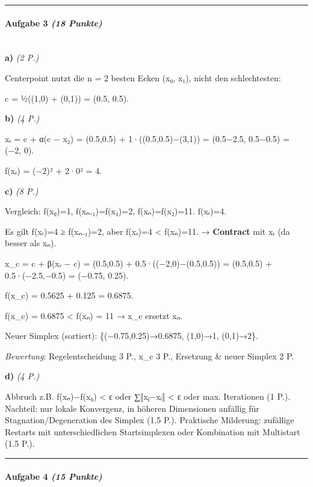 \documentclass[11pt, a4paper]{article}
\begin{document}
\noindent\textcolor{rulegray}{\rule{\linewidth}{0.4pt}}


\paragraph{Aufgabe 3 \textit{(18 Punkte)}}\mbox{}\\[2pt]

\textbf{a)} \textit{(2 P.)}

Centerpoint nutzt die n = 2 besten Ecken (x⃗₀, x⃗₁), nicht den schlechtesten:

c⃗ = ½((1,0) + (0,1)) = (0.5, 0.5).


\textbf{b)} \textit{(4 P.)}

x⃗ᵣ = c⃗ + α(c⃗ − x⃗₂) = (0.5,0.5) + 1·((0.5,0.5)−(3,1)) = (0.5−2.5, 0.5−0.5) = (−2, 0).

f(x⃗ᵣ) = (−2)² + 2·0² = 4.


\textbf{c)} \textit{(8 P.)}

Vergleich: f(x⃗₀)=1, f(x⃗ₙ₋₁)=f(x⃗₁)=2, f(x⃗ₙ)=f(x⃗₂)=11. f(x⃗ᵣ)=4.

Es gilt f(x⃗ᵣ)=4 ≥ f(x⃗ₙ₋₁)=2, aber f(x⃗ᵣ)=4 < f(x⃗ₙ)=11. → \textbf{Contract} mit x⃗ᵣ (da besser als x⃗ₙ).


x⃗\_c = c⃗ + β(x⃗ᵣ − c⃗) = (0.5,0.5) + 0.5·((−2,0)−(0.5,0.5)) = (0.5,0.5) + 0.5·(−2.5,−0.5) = (−0.75, 0.25).

f(x⃗\_c) = 0.5625 + 0.125 = 0.6875.


f(x⃗\_c) = 0.6875 < f(x⃗ₙ) = 11 → x⃗\_c ersetzt x⃗ₙ.


Neuer Simplex (sortiert): \{(−0.75,0.25)→0.6875, (1,0)→1, (0,1)→2\}.


\textit{Bewertung}: Regelentscheidung 3 P., x⃗\_c 3 P., Ersetzung \& neuer Simplex 2 P.


\textbf{d)} \textit{(4 P.)}

Abbruch z.B. f(x⃗ₙ)−f(x⃗₀) < ε oder ∑‖x⃗ⱼ−x⃗ᵢ‖ < ε oder max. Iterationen (1 P.). Nachteil: nur lokale Konvergenz, in höheren Dimensionen anfällig für Stagnation/Degeneration des Simplex (1.5 P.). Praktische Milderung: zufällige Restarts mit unterschiedlichen Startsimplexen oder Kombination mit Multistart (1.5 P.).



\noindent\textcolor{rulegray}{\rule{\linewidth}{0.4pt}}


\paragraph{Aufgabe 4 \textit{(15 Punkte)}}\mbox{}\\[2pt]
\end{document}
